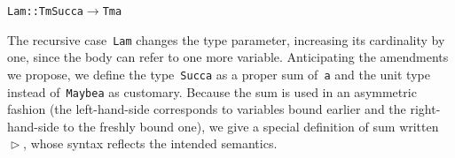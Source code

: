 \documentclass[9pt,authoryear]{sigplanconf}
\begin{document}
{{}\vphantom{$\{$}}\texttt{\mbox{\hspace{0.50em}}}\texttt{\mbox{\hspace{0.50em}}}\texttt{Lam}\texttt{\mbox{\hspace{0.50em}}}\texttt{{:}{:}}\texttt{\mbox{\hspace{0.50em}}}\texttt{Tm}\texttt{\mbox{\hspace{0.50em}}}\texttt{\makebox[1.22ex][l]{$ {(} $}}\texttt{Succ}\texttt{\mbox{\hspace{0.50em}}}\texttt{a}\texttt{\makebox[1.22ex][r]{$ {)} $}}\texttt{\mbox{\hspace{0.50em}}}\texttt{$ \rightarrow $}\texttt{\mbox{\hspace{0.50em}}}\texttt{Tm}\texttt{\mbox{\hspace{0.50em}}}\texttt{a}\texttt{{\nopagebreak \newline%
}\vphantom{$\{$}}%


%
The recursive case{~}\texttt{Lam} changes the type parameter, increasing
    its cardinality by one, since the body can refer to one more
    variable. Anticipating the amendments we propose, we define the
    type{~}\texttt{Succ}\texttt{\mbox{\hspace{0.50em}}}\texttt{a} as a proper sum of{~}\texttt{a} and the unit type{~}\texttt{\makebox[1.22ex][l]{$ {(} $}}\texttt{\makebox[1.22ex][r]{$ {)} $}}    instead of{~}\texttt{Maybe}\texttt{\mbox{\hspace{0.50em}}}\texttt{a} as customary. Because the sum is used in an
    asymmetric fashion (the left-hand-side corresponds to variables
    bound earlier and the right-hand-side to the freshly bound one),
    we give a special definition of sum written{~}\texttt{$ \vartriangleright $}, whose syntax
    reflects the intended semantics.%


{\nopagebreak }
\end{document}
